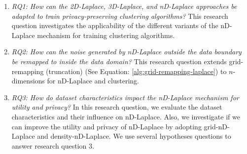 \begin{enumerate}
    \item \textit{RQ1: How can the 2D-Laplace, 3D-Laplace, and nD-Laplace approaches be adapted to train privacy-preserving clustering algorithms?} \newline
          This research question investigates the applicability of the different variants of the nD-Laplace mechanism for training clustering algorithms.
    \item \textit{RQ2: How can the noise generated by nD-Laplace outside the data boundary be remapped to inside the data domain?} \newline
          This research question extends grid-remapping (truncation) (See Equation: \ref{alg:grid-remapping-laplace}) to $n$-dimensions for nD-Laplace and clustering.
    \item \textit{RQ3: How do dataset characteristics impact the nD-Laplace mechanism for utility and privacy?} \newline
          In this research question, we evaluate the dataset characteristics and their influence on nD-Laplace.
          Also, we investigate if we can improve the utility and privacy of nD-Laplace by adopting grid-nD-Laplace and density-nD-Laplace.
          We use several hypotheses questions to answer research question 3.


\end{enumerate}

